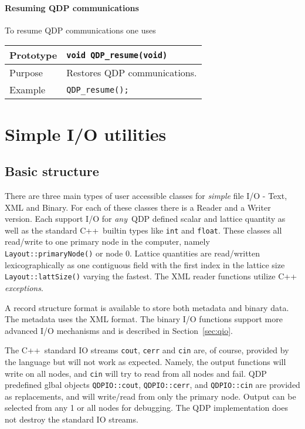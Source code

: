 \documentclass[12pt,letterpaper]{article}
\newcommand{\cpp}{C++}
\begin{document}
\paragraph{Resuming QDP communications}

To resume QDP communications one uses
\begin{flushleft}
\begin{tabular}{|l|l|}
  \hline
  Prototype      & \verb|void QDP_resume(void)| \\
\hline
Purpose        & Restores QDP communications. \\
\hline
Example  & \verb|QDP_resume();| \\
\hline
  \end{tabular}
\end{flushleft}

\newpage

\section{Simple I/O utilities}
\label{sec:simpleio}

\subsection{Basic structure}

There are three main types of user accessible classes for {\em simple}
file I/O - Text, XML and Binary. For each of these classes there is a
Reader and a Writer version. Each support I/O for {\em any}\  QDP
defined scalar and lattice quantity as well as the standard \cpp\
builtin types like \verb|int| and \verb|float|. These classes all
read/write to one primary node in the computer, namely
\verb|Layout::primaryNode()| or node 0. Lattice quantities are read/written
lexicographically as one contiguous field with the first index in the
lattice size \verb|Layout::lattSize()| varying the fastest.
The XML reader functions utilize \cpp{} {\em exceptions}. 

A record structure format is available to store both metadata and binary data.
The metadata uses the XML format. The binary I/O functions support more advanced
I/O mechanisms and is described in Section~\ref{sec:qio}.

The \cpp\ standard IO streams \verb|cout|, \verb|cerr| and \verb|cin|
are, of course, provided by the language but will not work as
expected. Namely, the output functions will write on all nodes, and
\verb|cin| will try to read from all nodes and fail. QDP predefined
glbal objects \verb|QDPIO::cout|, \verb|QDPIO::cerr|, and \verb|QDPIO::cin| are
provided as replacements, and will write/read from only the primary
node. Output can be selected from any 1 or all nodes for debugging.
The QDP implementation does not destroy the standard IO streams.
\end{document}
